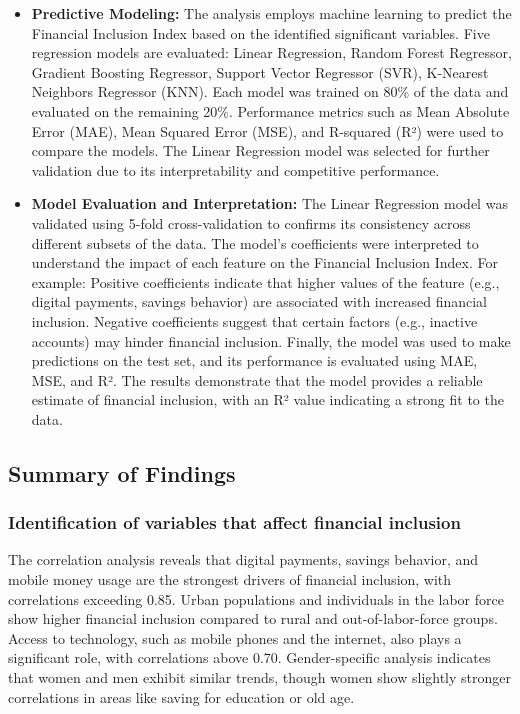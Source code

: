 \documentclass[preprint, 3p,
authoryear]{elsarticle} %
\begin{document}
\begin{itemize}
\item
  \textbf{Predictive Modeling:} The analysis employs machine learning to
  predict the Financial Inclusion Index based on the identified
  significant variables. Five regression models are evaluated: Linear
  Regression, Random Forest Regressor, Gradient Boosting Regressor,
  Support Vector Regressor (SVR), K-Nearest Neighbors Regressor (KNN).
  Each model was trained on 80\% of the data and evaluated on the
  remaining 20\%. Performance metrics such as Mean Absolute Error (MAE),
  Mean Squared Error (MSE), and R-squared (R²) were used to compare the
  models. The Linear Regression model was selected for further
  validation due to its interpretability and competitive performance.
\item
  \textbf{Model Evaluation and Interpretation:} The Linear Regression
  model was validated using 5-fold cross-validation to confirms its
  consistency across different subsets of the data. The model's
  coefficients were interpreted to understand the impact of each feature
  on the Financial Inclusion Index. For example: Positive coefficients
  indicate that higher values of the feature (e.g., digital payments,
  savings behavior) are associated with increased financial inclusion.
  Negative coefficients suggest that certain factors (e.g., inactive
  accounts) may hinder financial inclusion. Finally, the model was used
  to make predictions on the test set, and its performance is evaluated
  using MAE, MSE, and R². The results demonstrate that the model
  provides a reliable estimate of financial inclusion, with an R² value
  indicating a strong fit to the data.
\end{itemize}

\subsection{Summary of Findings}\label{summary-of-findings}

\subsubsection{Identification of variables that affect financial
inclusion}\label{identification-of-variables-that-affect-financial-inclusion}

The correlation analysis reveals that digital payments, savings
behavior, and mobile money usage are the strongest drivers of financial
inclusion, with correlations exceeding 0.85. Urban populations and
individuals in the labor force show higher financial inclusion compared
to rural and out-of-labor-force groups. Access to technology, such as
mobile phones and the internet, also plays a significant role, with
correlations above 0.70. Gender-specific analysis indicates that women
and men exhibit similar trends, though women show slightly stronger
correlations in areas like saving for education or old age.
\end{document}
